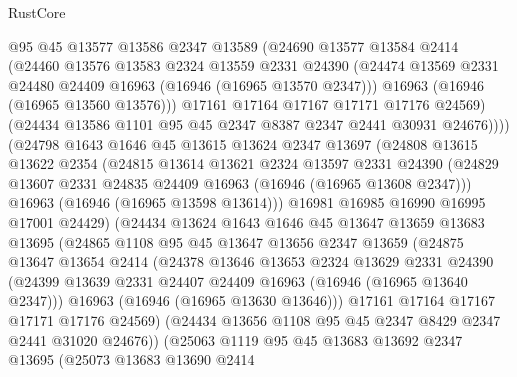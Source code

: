 \begin{lexlean}{RustCore}
\begin{coremodule}
              @95
              @45
              @13577
              @13586
              @2347
              @13589
              (@24690
                @13577
                @13584
                @2414
                (@24460
                  @13576
                  @13583
                  @2324
                  @13559
                  @2331
                  @24390
                  (@24474 @13569 @2331 @24480 @24409 @16963 (@16946 (@16965 @13570 @2347)))
                  @16963
                  (@16946 (@16965 @13560 @13576)))
                @17161
                @17164
                @17167
                @17171
                @17176
                @24569)
              (@24434 @13586 @1101 @95 @45 @2347 @8387 @2347 @2441 @30931 @24676))))
        (@24798
          @1643
          @1646
          @45
          @13615
          @13624
          @2347
          @13697
          (@24808
            @13615
            @13622
            @2354
            (@24815
              @13614
              @13621
              @2324
              @13597
              @2331
              @24390
              (@24829 @13607 @2331 @24835 @24409 @16963 (@16946 (@16965 @13608 @2347)))
              @16963
              (@16946 (@16965 @13598 @13614)))
            @16981
            @16985
            @16990
            @16995
            @17001
            @24429)
          (@24434
            @13624
            @1643
            @1646
            @45
            @13647
            @13659
            @13683
            @13695
            (@24865
              @1108
              @95
              @45
              @13647
              @13656
              @2347
              @13659
              (@24875
                @13647
                @13654
                @2414
                (@24378
                  @13646
                  @13653
                  @2324
                  @13629
                  @2331
                  @24390
                  (@24399 @13639 @2331 @24407 @24409 @16963 (@16946 (@16965 @13640 @2347)))
                  @16963
                  (@16946 (@16965 @13630 @13646)))
                @17161
                @17164
                @17167
                @17171
                @17176
                @24569)
              (@24434 @13656 @1108 @95 @45 @2347 @8429 @2347 @2441 @31020 @24676))
            (@25063
              @1119
              @95
              @45
              @13683
              @13692
              @2347
              @13695
              (@25073
                @13683
                @13690
                @2414

\end{coremodule}
\end{lexlean}
